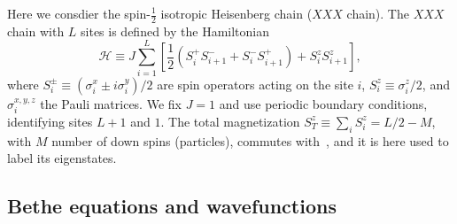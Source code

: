 \documentclass[11pt]{iopart}
\begin{document}
Here we consdier the spin-$\frac{1}{2}$ isotropic Heisenberg chain ($XXX$ chain). 
The $XXX$ chain with $L$ sites is defined by the Hamiltonian 
%
\begin{equation}
\label{xxx-ham}
{\mathcal H}\equiv J\sum\limits_{i=1}^L\left[\frac{1}{2}(S_i^+S^-_{i+1} 
+S_i^{-}S_{i+1}^+)+S_i^zS_{i+1}^z\right],  
\end{equation}
%
where $S^{\pm}_i\equiv (\sigma_i^x\pm i\sigma_i^y)/2$ are spin operators acting on the 
site $i$, $S_i^z\equiv\sigma_i^z/2$, and $\sigma^{x,y,z}_i$ the Pauli matrices. We fix 
$J=1$ and use periodic boundary conditions, identifying sites $L+1$ and $1$. The total 
magnetization $S_{T}^z\equiv\sum_iS_i^z=L/2-M$, with $M$ number of down spins (particles), 
commutes with~, and it is here used to label its eigenstates. 

\subsection{Bethe equations and wavefunctions}
\label{bethe_equations}
\end{document}
